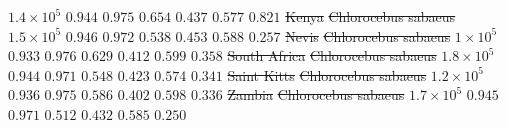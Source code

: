 \documentclass{article} %
\providecommand{\DIFdeltex}[1]{{\protect\color{red}\sout{#1}}}                      %
\providecommand{\DIFdelFL}[1]{\DIFdel{#1}} %
\providecommand{\DIFdel}[1]{\texorpdfstring{\DIFdeltex{#1}}{}} %
\begin{document}
\DIFdelFL{$1.4\times 10^{5}$ }%
\DIFdelFL{$ 0.944$ }%
\DIFdelFL{$ 0.975$ }%
\DIFdelFL{$ 0.654$ }%
\DIFdelFL{$ 0.437$ }%
\DIFdelFL{$ 0.577$ }%
\DIFdelFL{$ 0.821$ }%
\DIFdelFL{Kenya }%
\DIFdelFL{Chlorocebus sabaeus }%
\DIFdelFL{$1.5\times 10^{5}$ }%
\DIFdelFL{$ 0.946$ }%
\DIFdelFL{$ 0.972$ }%
\DIFdelFL{$ 0.538$ }%
\DIFdelFL{$ 0.453$ }%
\DIFdelFL{$ 0.588$ }%
\DIFdelFL{$ 0.257$ }%
\DIFdelFL{Nevis }%
\DIFdelFL{Chlorocebus sabaeus }%
\DIFdelFL{$ 1\times 10^{5}$ }%
\DIFdelFL{$ 0.933$ }%
\DIFdelFL{$ 0.976$ }%
\DIFdelFL{$ 0.629$ }%
\DIFdelFL{$ 0.412$ }%
\DIFdelFL{$ 0.599$ }%
\DIFdelFL{$ 0.358$ }%
\DIFdelFL{South Africa }%
\DIFdelFL{Chlorocebus sabaeus }%
\DIFdelFL{$1.8\times 10^{5}$ }%
\DIFdelFL{$ 0.944$ }%
\DIFdelFL{$ 0.971$ }%
\DIFdelFL{$ 0.548$ }%
\DIFdelFL{$ 0.423$ }%
\DIFdelFL{$ 0.574$ }%
\DIFdelFL{$ 0.341$ }%
\DIFdelFL{Saint Kitts }%
\DIFdelFL{Chlorocebus sabaeus }%
\DIFdelFL{$1.2\times 10^{5}$ }%
\DIFdelFL{$ 0.936$ }%
\DIFdelFL{$ 0.975$ }%
\DIFdelFL{$ 0.586$ }%
\DIFdelFL{$ 0.402$ }%
\DIFdelFL{$ 0.598$ }%
\DIFdelFL{$ 0.336$ }%
\DIFdelFL{Zambia }%
\DIFdelFL{Chlorocebus sabaeus }%
\DIFdelFL{$1.7\times 10^{5}$ }%
\DIFdelFL{$ 0.945$ }%
\DIFdelFL{$ 0.971$ }%
\DIFdelFL{$ 0.512$ }%
\DIFdelFL{$ 0.432$ }%
\DIFdelFL{$ 0.585$ }%
\DIFdelFL{$ 0.250$ }%
\end{document}
